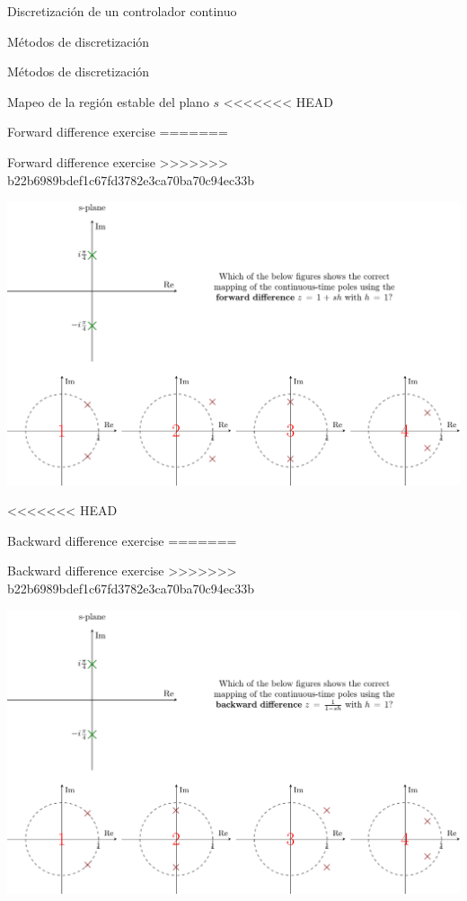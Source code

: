 \documentclass[presentation,aspectratio=1610]{beamer}
\begin{document}
\begin{frame}[label={sec:org86d23da}]{Discretización de un controlador continuo}
\begin{frame}[label={sec:org3ca2082}]{Métodos de discretización}
\begin{frame}[label={sec:orga78cff2}]{Métodos de discretización}
\begin{frame}[label={sec:org28bff53}]{Mapeo de la región estable del plano \(s\)}
<<<<<<< HEAD
\begin{frame}[label={sec:org9bb57fa}]{Forward difference exercise}
=======
\begin{frame}[label={sec:org64c7bb5}]{Forward difference exercise}
>>>>>>> b22b6989bdef1c67fd3782e3ca70ba70c94ec33b
\begin{center}
\includegraphics[width=\linewidth]{../../figures/forward-diff-exercise}
\end{center}
\end{frame}
<<<<<<< HEAD
\begin{frame}[label={sec:orgaf8c1b0}]{Backward difference exercise}
=======
\begin{frame}[label={sec:orga8b6234}]{Backward difference exercise}
>>>>>>> b22b6989bdef1c67fd3782e3ca70ba70c94ec33b
\begin{center}
\includegraphics[width=\linewidth]{../../figures/backward-diff-exercise}
\end{center}
\end{frame}



\end{frame}
\end{frame}
\end{frame}
\end{frame}
\end{frame}
\end{frame}
\end{document}
